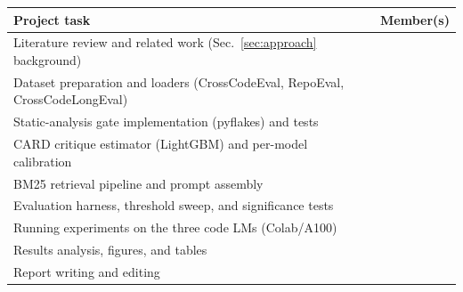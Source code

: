 \documentclass[10pt,conference]{IEEEtran}
\begin{document}
\begin{table}[h]
\centering
\footnotesize
\setlength{\tabcolsep}{4pt}
\begin{tabular}{p{} p{}}
\toprule
Project task & Member(s) \\
\midrule
Literature review and related work (Sec.~\ref{sec:approach} background) & \\
Dataset preparation and loaders (CrossCodeEval, RepoEval, CrossCodeLongEval) & \\
Static-analysis gate implementation (pyflakes) and tests & \\
CARD critique estimator (LightGBM) and per-model calibration & \\
BM25 retrieval pipeline and prompt assembly & \\
Evaluation harness, threshold sweep, and significance tests & \\
Running experiments on the three code LMs (Colab/A100) & \\
Results analysis, figures, and tables & \\
Report writing and editing & \\
\bottomrule
\end{tabular}
\end{table}




\end{document}
